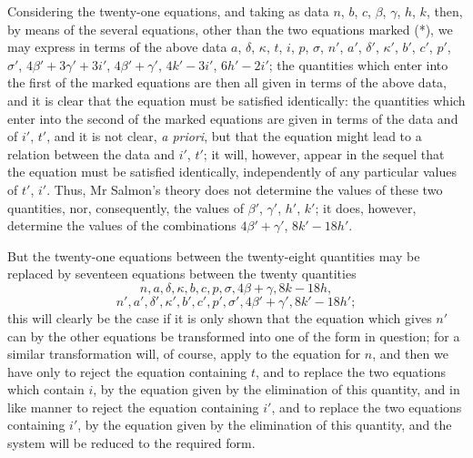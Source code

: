 \documentclass[11pt,a4paper]{book}
\begin{document}
Considering the twenty-one equations, and taking as data $n$, $b$, $c$, $\beta$, $\gamma$, $h$, $k$, then, by means of the several equations, other than the two equations marked (*), we may express in terms of the above data $a$, $\delta$, $\kappa$, $t$, $i$, $p$, $\sigma$, $n'$, $a'$, $\delta'$, $\kappa'$, $b'$, $c'$, $p'$, $\sigma'$, $4\beta'+3\gamma'+3i'$, $4\beta'+\gamma'$, $4k'-3i'$, $6h'-2i'$; the quantities which enter into the first of the marked equations are then all given in terms of the above data, and it is clear that the equation must be satisfied identically: the quantities which enter into the second of the marked equations are given in terms of the data and of $i'$, $t'$, and it is not clear, \textit{a priori}, but that the equation might lead to a relation between the data and $i'$, $t'$; it will, however, appear in the sequel that the equation must be satisfied identically, independently of any particular values of $t'$, $i'$. Thus, Mr Salmon's theory does not determine the values of these two quantities, nor, consequently, the values of $\beta'$, $\gamma'$, $h'$, $k'$; it does, however, determine the values of the combinations $4\beta'+\gamma'$, $8k'-18h'$.

But the twenty-one equations between the twenty-eight quantities may be replaced by seventeen equations between the twenty quantities
\[
n,a,\delta,\kappa,b,c,p,\sigma,4\beta+\gamma,8k-18h,
\]
\[
n',a',\delta',\kappa',b',c',p',\sigma',4\beta'+\gamma',8k'-18h';
\]
this will clearly be the case if it is only shown that the equation which gives $n'$ can by the other equations be transformed into one of the form in question; for a similar transformation will, of course, apply to the equation for $n$, and then we have only to reject the equation containing $t$, and to replace the two equations which contain $i$, by the equation given by the elimination of this quantity, and in like manner to reject the equation containing $i'$, and to replace the two equations containing $i'$, by the equation given by the elimination of this quantity, and the system will be reduced to the required form.
\end{document}
